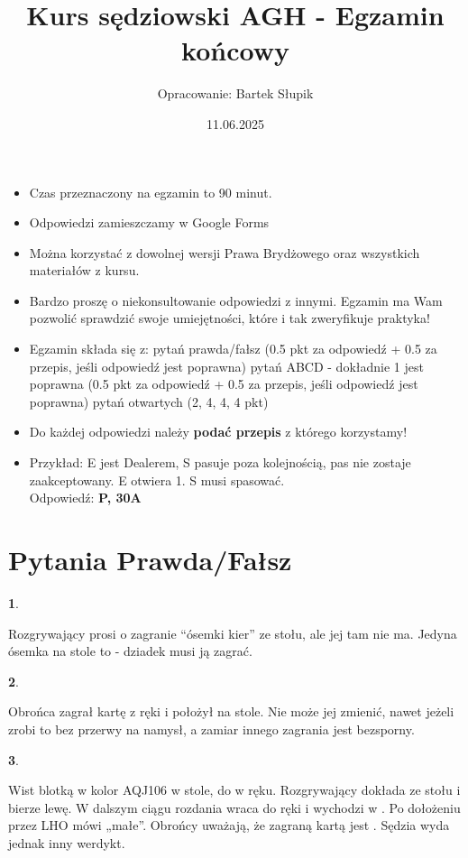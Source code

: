 \documentclass[12pt, a4paper]{article}
\title{Kurs sędziowski AGH - Egzamin końcowy}
\date{11.06.2025}
\author{Opracowanie: Bartek Słupik}
\newtheorem{pyt}{}
\begin{document}
\maketitle

\begin{itemize}
	\item Czas przeznaczony na egzamin to 90 minut.
	\item Odpowiedzi zamieszczamy w Google Forms
	\item Można korzystać z dowolnej wersji Prawa Brydżowego oraz wszystkich materiałów z kursu.
	\item Bardzo proszę o niekonsultowanie odpowiedzi z innymi. Egzamin ma Wam pozwolić sprawdzić swoje umiejętności, które i tak zweryfikuje praktyka!
	\item Egzamin składa się z:
	 pytań prawda/fałsz (0.5 pkt za odpowiedź + 0.5 za przepis, jeśli odpowiedź jest poprawna)
	 pytań ABCD - dokładnie 1 jest poprawna (0.5 pkt za odpowiedź + 0.5 za przepis, jeśli odpowiedź jest poprawna)
	 pytań otwartych (2, 4, 4, 4 pkt)
	\item Do każdej odpowiedzi należy \textbf{podać przepis} z którego korzystamy!
	\item Przykład: E jest Dealerem, S pasuje poza kolejnością, pas nie zostaje zaakceptowany. E otwiera 1\clubs. S musi spasować. \\
			Odpowiedź: \textbf{P, 30A}
\end{itemize}

\pagebreak

\section*{Pytania Prawda/Fałsz}

\begin{pyt} 
\end{pyt}
Rozgrywający prosi o zagranie “ósemki kier” ze stołu, ale jej tam nie ma. Jedyna ósemka
na stole to  - dziadek musi ją zagrać.

\begin{pyt} 
\end{pyt}
Obrońca zagrał kartę z ręki i położył na stole. Nie może jej zmienić, nawet jeżeli zrobi to
bez przerwy na namysł, a zamiar innego zagrania jest bezsporny.


\begin{pyt} 
\end{pyt}
Wist blotką w kolor \xdiams AQJ106 w stole, do  w ręku. Rozgrywający dokłada ze stołu
 i bierze lewę. W dalszym ciągu rozdania wraca do ręki i wychodzi w \diams. Po dołożeniu
przez LHO mówi „małe”. Obrońcy uważają, że zagraną kartą jest . Sędzia wyda jednak
inny werdykt.
\end{document}
